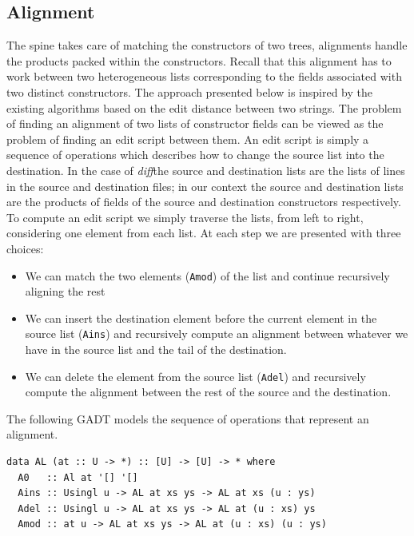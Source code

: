 \documentclass[11pt, titlepage]{article}
\newcommand{\toHaskell}[1]{\texttt{#1}\xspace}
\newcommand{\diff}{\emph{diff}}
\newcommand{\ains}{\toHaskell{Ains}}
\newcommand{\adel}{\toHaskell{Adel}}
\newcommand{\amod}{\toHaskell{Amod}}
\begin{document}
\subsection{Alignment}\label{alignment}

The spine takes care of matching
the constructors of two trees, alignments handle the products packed within the constructors.
Recall that this alignment has to work between two heterogeneous lists
corresponding to the fields associated with two distinct constructors.
The approach presented below is inspired by the existing algorithms
based on the edit distance between two strings. The problem of finding
an alignment of two lists of constructor fields can be viewed as the
problem of finding an edit script between them. An edit script is
simply a sequence of operations which describes how to change the source
list into the destination. In the case of \diff the source and destination lists are the lists of lines in the source and destination files; in our context
the source and destination lists are the products of fields of the source and destination constructors respectively. 
To compute an edit script we simply
traverse the lists, from left to right, considering one element from each
list. At each step we are presented with three choices:

\begin{itemize}
\item
  We can match the two elements (\amod) of the list and continue
  recursively aligning the rest
\item
  We can insert the destination element before the current element in
  the source list (\ains) and recursively compute an alignment between
  whatever we have in the source list and the tail of the destination.
\item
  We can delete the element from the source list (\adel) and recursively
  compute the alignment between the rest of the source and the
  destination.
\end{itemize}

The following GADT models the sequence of operations that represent an 
alignment.

\begin{verbatim}
data AL (at :: U -> *) :: [U] -> [U] -> * where
  A0   :: Al at '[] '[]
  Ains :: Usingl u -> AL at xs ys -> AL at xs (u : ys)
  Adel :: Usingl u -> AL at xs ys -> AL at (u : xs) ys
  Amod :: at u -> AL at xs ys -> AL at (u : xs) (u : ys)
\end{verbatim}
\end{document}
